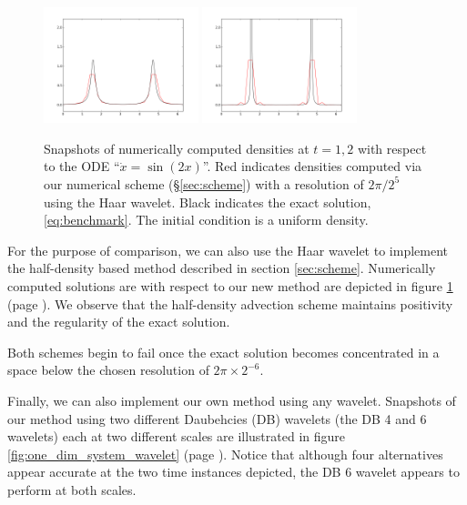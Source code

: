 \documentclass[a4paper, 12 pt]{amsart}
\begin{document}
\begin{figure}[h!]
  \centering
  \includegraphics[width=0.4\textwidth]{./images/half_density_sqr_t1_00.png}
  \includegraphics[width=0.4\textwidth]{./images/half_density_sqr_t2_00.png}
  \caption{Snapshots of numerically computed densities at $t=1,2$ with respect to the ODE ``$\dot{x} = \sin(2x)$''.
  	Red indicates densities computed via our numerical scheme  (\S \ref{sec:scheme}) with a resolution of $2\pi / 2^5$
  	using the Haar wavelet. Black indicates the exact solution, \eqref{eq:benchmark}.
	The initial condition is a uniform density.}
  \label{fig:half_density_haar}
\end{figure}

For the purpose of comparison, we can also use the Haar wavelet to implement the half-density based method described in section \ref{sec:scheme}.
Numerically computed solutions are with respect to our new method are depicted in figure \ref{fig:half_density_haar} (page \pageref{fig:half_density_haar}).
We observe that the half-density advection scheme maintains positivity and the regularity of the exact solution.

Both schemes begin to fail once the exact solution becomes concentrated in a space below the chosen resolution of $2\pi \times 2^{-6}$.

Finally, we can also implement our own method using any wavelet. Snapshots of our method using two different Daubehcies (DB) wavelets (the DB 4 and 6 wavelets) each at two different scales are illustrated in figure \ref{fig:one_dim_system_wavelet} (page \pageref{fig:one_dim_system_wavelet}). Notice that although four alternatives appear accurate at the two time instances depicted, the DB 6 wavelet appears to perform at both scales. 
\end{document}
